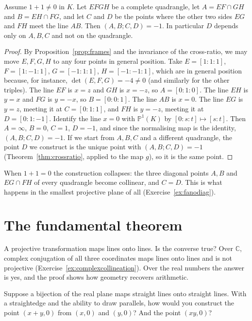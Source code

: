 \begin{theorem}\label{thm:harmonic}
Assume $1+1\ne0$ in $K$. Let $EFGH$ be a complete quadrangle, let $A=EF\cap GH$ and $B=EH\cap FG$, and let $C$ and $D$ be the points where the
other two sides $EG$ and $FH$ meet the line $AB$. Then $(A,B;C,D)=-1$. In particular $D$ depends only on $A,B,C$ and not on the quadrangle.
\end{theorem}

\begin{proof}
By Proposition~\ref{prop:frames} and the invariance of the cross-ratio, we may move $E,F,G,H$ to any four points in general position. Take
$E=[1:1:1]$, $F=[1:-1:1]$, $G=[-1:1:1]$, $H=[-1:-1:1]$, which are in general position because, for instance, $\det(E,F,G)=-4\ne0$ (and similarly for the
other triples). The line $EF$ is $x=z$ and $GH$ is $x=-z$, so $A=[0:1:0]$. The line $EH$ is $y=x$ and $FG$ is $y=-x$, so $B=[0:0:1]$. The line $AB$
is $x=0$. The line $EG$ is $y=z$, meeting it at $C=[0:1:1]$, and $FH$ is $y=-z$, meeting it at $D=[0:1:-1]$. Identify the line $x=0$ with
$\mathbb P^1(K)$ by $[0:s:t]\mapsto[s:t]$. Then $A=\infty$, $B=0$, $C=1$, $D=-1$, and since the normalising map is the identity,
$(A,B;C,D)=-1$. If we start from $A,B,C$ and a different quadrangle, the point $D$ we construct is the unique point with $(A,B;C,D)=-1$
(Theorem~\ref{thm:crossratio}, applied to the map $g$), so it is the same point.
\end{proof}

When $1+1=0$ the construction collapses: the three diagonal points $A,B$ and $EG\cap FH$ of every quadrangle become collinear, and $C=D$. This is
what happens in the smallest projective plane of all (Exercise~\ref{ex:fanodiag}).

\section{The fundamental theorem}

A projective transformation maps lines onto lines. Is the converse true? Over $\mathbb C$, complex conjugation of all three coordinates maps lines
onto lines and is not projective (Exercise~\ref{ex:complexcollineation}). Over the real numbers the answer is yes, and the proof shows how
geometry recovers arithmetic.

\begin{think}
Suppose a bijection of the real plane maps straight lines onto straight lines. With a straightedge and the ability to draw parallels, how would
you construct the point $(x+y,0)$ from $(x,0)$ and $(y,0)$? And the point $(xy,0)$?
\end{think}

